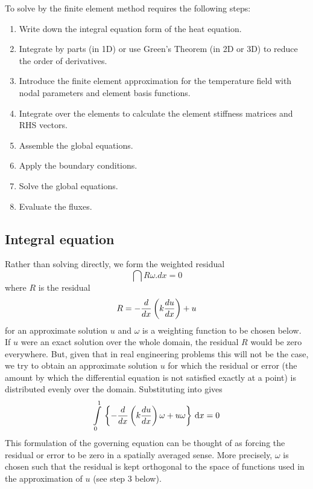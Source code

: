To solve  by the finite element method requires the 
following steps:
\begin{enumerate}
\item Write down the integral equation form of the heat equation.
\item Integrate by parts (in 1D) or use Green's Theorem (in 2D or 3D) to
  reduce the order of derivatives.
\item Introduce the finite element approximation for the temperature field 
  with nodal parameters and element basis functions.
\item Integrate over the elements to calculate the element stiffness
  matrices and RHS vectors.
\item Assemble the global equations.
\item Apply the boundary conditions.
\item Solve the global equations.
\item Evaluate the fluxes.
\end{enumerate}

\subsection{Integral equation}

Rather than solving  directly, we form the 
weighted residual  
\begin{equation}
  \dint R\omega.dx = 0
  \label{eqn:integral_eqn}
\end{equation}
where $R$ is the residual 
\begin{equation}
   R = - \dfrac{ d  }{d x} \left( k \dfrac{ d u}{d x}  \right) + u 
   \label{eqn:int_equation_2}
\end{equation}
for an approximate solution $u$ and $\omega$ is a weighting function
 to be chosen below. If $u$ were an exact solution
over the whole domain, the residual $R$ would be zero everywhere. But, given
that in real engineering problems this will not be the case, we try to obtain
an approximate solution $u$ for which the residual or error (\ie the amount
by which the differential equation is not satisfied exactly at a point) is
distributed evenly over the domain.  Substituting 
into  gives
\begin{equation}
  \gint{0}{1}{\bbrac{- \dby{ }{x}\pbrac{k\dby{u}{x}}\omega + u\omega}}{x} = 0
  \label{eqn:substitution}
\end{equation}
This formulation of the governing equation can be thought of as forcing the
residual or error to be zero in a spatially averaged sense.  More precisely,
$\omega$ is chosen such that the residual is kept orthogonal to the space of
functions used in the approximation of $u$ (see step 3 below).


